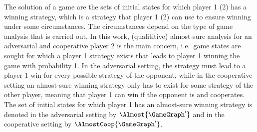     The solution of a game are the sets of initial states for which player 1 (2) has a winning strategy, which is a strategy that player 1 (2) can use to ensure winning under some circumstances.
    The circumstances depend on the type of game analysis that is carried out.
    In this work, (qualititive) almost-sure analysis for an adversarial and cooperative player 2 is the main concern, i.e.\ game states are sought for which a player 1 strategy exists that leads to player 1 winning the game with probability 1.
    In the adversarial setting, the strategy must lead to a player 1 win for every possible strategy of the opponent, while in the cooperative setting an almost-sure winning strategy only has to exist for some strategy of the other player, meaning that player 1 can win if the opponent is  and cooperates.
    The set of initial states for which player 1 has an almost-sure winning strategy is denoted in the adversarial setting by $\Almost{\GameGraph'}$ and in the cooperative setting by $\AlmostCoop{\GameGraph'}$.

\stopsubsection

